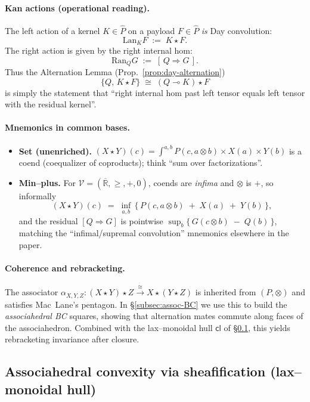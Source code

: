 \documentclass[11pt]{article}
\numberwithin{equation}{section}
\theoremstyle{upright}
\newcommand{\V}{\mathcal{V}}
\newcommand{\Lan}{\mathrm{Lan}}
\newcommand{\Ran}{\mathrm{Ran}}
\begin{document}
\paragraph{Kan actions (operational reading).}
The left action of a kernel $K\in\widehat P$ on a payload $F\in\widehat P$
\emph{is} Day convolution:
\[
\Lan_K F \;:=\; K\star F.
\]
The right action is given by the right internal hom:
\[
\Ran_Q G \;:=\; [\,Q\Rightarrow G\,].
\]
Thus the Alternation Lemma (Prop.~\ref{prop:day-alternation})
\[
\{Q,\,K\star F\}\;\cong\; (Q\multimap K)\star F
\]
is simply the statement that “right internal hom past left tensor equals
left tensor with the residual kernel”.

\paragraph{Mnemonics in common bases.}
\begin{itemize}[leftmargin=*, itemsep=.25ex]
\item \textbf{Set (unenriched).}
$(X\star Y)(c)=\displaystyle\int^{a,b} P(c,a\otimes b)\times X(a)\times Y(b)$
is a coend (coequalizer of coproducts); think “sum over factorizations”.
\item \textbf{Min–plus.}
For $\V=(\overline{\mathbb R},\ge,+,0)$, coends are \emph{infima} and $\otimes$
is $+$, so informally
\[
(X\star Y)(c)\;=\;\inf_{a,b}\,\big\{\,P(c,a\otimes b)\;+\;X(a)\;+\;Y(b)\,\big\},
\]
and the residual $[Q\Rightarrow G]$ is pointwise
$\sup_b \{\,G(c\otimes b)\;-\;Q(b)\,\}$, matching the “infimal/supremal convolution”
mnemonics elsewhere in the paper.
\end{itemize}

\paragraph{Coherence and rebracketing.}
The associator $\alpha_{X,Y,Z}:(X\star Y)\star Z \xrightarrow{\cong} X\star(Y\star Z)$
is inherited from $(P,\otimes)$ and satisfies Mac~Lane’s pentagon.
In §\ref{subsec:assoc-BC} we use this to build the \emph{associahedral BC} squares,
showing that alternation mates commute along faces of the associahedron.
Combined with the lax–monoidal hull $\mathsf{cl}$ of §\ref{subsec:assoc-convexity},
this yields rebracketing invariance after closure.

\subsection{Associahedral convexity via sheafification (lax--monoidal hull)}
\label{subsec:assoc-convexity}
\end{document}

